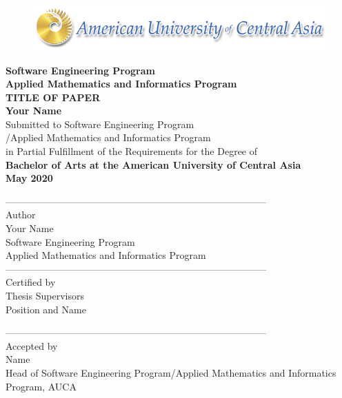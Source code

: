 \begin{titlepage}

\begin{figure}[H]
\centering
\includegraphics{Title/logo.png}
\caption*{}
\label{fig:entropy} 
\end{figure}

\centering

\textbf{Software Engineering Program\\ Applied Mathematics and Informatics Program}\\[0.4in]

\LARGE{\textbf{TITLE OF PAPER}}\\[0.4in] 

\large{\textbf{Your Name}}\\[0.4in] %


Submitted to Software Engineering Program\\
/Applied Mathematics and Informatics Program\\ 
in Partial Fulfillment of the Requirements for the Degree of\\
\textbf{Bachelor of Arts \break at the \break American University of Central Asia}\\[0.25in]

\textbf{May 2020}\\ %

\raggedright
---------------------------------------------------------------------------------\\
Author \\
Your Name\\ %
Software Engineering Program \\
Applied Mathematics and Informatics Program\\

---------------------------------------------------------------------------------\\
Certified by \\
Thesis Supervisors \\
Position and Name %

---------------------------------------------------------------------------------\\
Accepted by \\
Name \\  %
Head of Software Engineering Program/Applied Mathematics and Informatics Program, AUCA\\

\newpage
\end{titlepage}